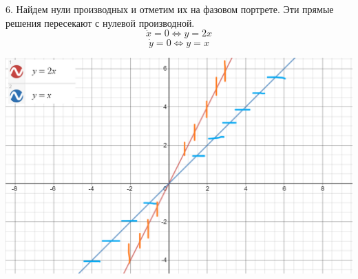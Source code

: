 \documentclass[10pt]{report}
\begin{document}
6. Найдем нули производных и отметим их на фазовом портрете. Эти прямые решения пересекают с нулевой производной. \[ \dot{x}=0 \Leftrightarrow y=2x\]
\[ \dot{y}=0 \Leftrightarrow y=x\]
\begin{center}
{\includegraphics[scale=0.4]{graph7.3.png}} 
\end{center}
\end{document}
